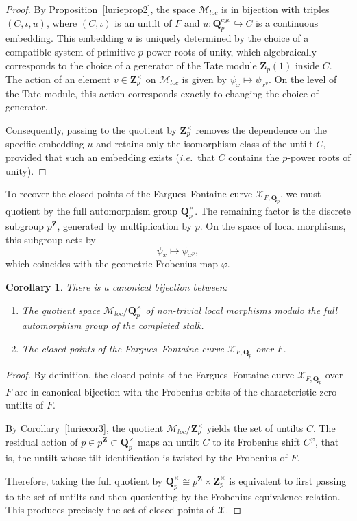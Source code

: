 \documentclass[11pt,a4paper]{article}
\newtheorem{corollary}[theorem]{Corollary}
\newcommand{\Q}{\mathbf{Q}}
\newcommand{\Z}{\mathbf{Z}}
\def\ie{{\it i.e.\/}\ }
\begin{document}
\begin{proof}
By Proposition~\ref{lurieprop2}, the space 
$\mathcal{M}_{loc}$ 
is in bijection with triples 
$(C,\iota,u)$, 
where $(C,\iota)$ is an untilt of $F$ and 
$u:\Q_p^{cyc}\hookrightarrow C$ 
is a continuous embedding. This embedding $u$ is uniquely determined by the choice of a compatible system of primitive $p$-power roots of unity, which algebraically corresponds to the choice of a generator of the Tate module $\Z_p(1)$ inside $C$.
The action of an element 
$v\in\Z_p^\times$ 
on $\mathcal{M}_{loc}$ 
is given by 
$\psi_x\mapsto\psi_{x^v}$. 
On the level of the Tate module, this action corresponds exactly to changing the choice of generator. 

Consequently, passing to the quotient by $\Z_p^\times$ removes the dependence on the specific embedding $u$ and retains only the isomorphism class of the untilt $C$, provided that such an embedding exists (\ie that $C$ contains the $p$-power roots of unity).
\end{proof}

To recover the closed points of the Fargues–Fontaine curve $\mathcal{X}_{F, \Q_p}$, we must quotient by the full automorphism group $\Q_p^\times$. 
The remaining factor is the discrete subgroup $p^\Z$, generated by multiplication by $p$. 
On the space of local morphisms, this subgroup acts by
\[
\psi_x \longmapsto \psi_{x^p},
\]
which coincides with the geometric Frobenius map $\varphi$.

\begin{corollary}\label{luriecor4}
There is a canonical bijection between:
\begin{enumerate}
    \item The quotient space 
    $\mathcal{M}_{loc}/\Q_p^\times$ 
    of non-trivial local morphisms modulo the full automorphism group of the completed stalk.
    
    \item The closed points of the Fargues–Fontaine curve 
    $\mathcal{X}_{F,\Q_p}$ over $F$.
\end{enumerate}
\end{corollary}

\begin{proof}
By definition, the closed points of the Fargues–Fontaine curve $\mathcal{X}_{F,\Q_p}$ over $F$ are in canonical bijection with the Frobenius orbits of the characteristic-zero untilts of $F$. 

By Corollary~\ref{luriecor3}, the quotient 
$\mathcal{M}_{loc}/\Z_p^\times$ 
yields the set of untilts $C$. 
The residual action of 
$p\in p^\Z\subset \Q_p^\times$ 
maps an untilt $C$ to its Frobenius shift $C^\varphi$, that is, the untilt whose tilt identification is twisted by the Frobenius of $F$. 

Therefore, taking the full quotient by 
$\Q_p^\times \cong p^\Z \times \Z_p^\times$ 
is equivalent to first passing to the set of untilts and then quotienting by the Frobenius equivalence relation. 
This produces precisely the set of closed points of $\mathcal{X}$.
\end{proof}
\end{document}
